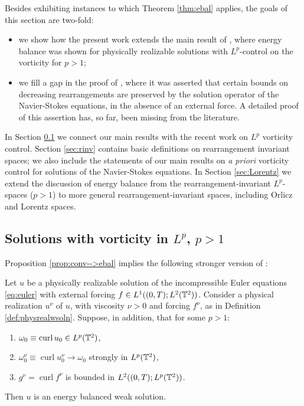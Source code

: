 \documentclass[reqno,12pt]{amsart}
\DeclareMathOperator{\curl}{curl}
\begin{document}
Besides exhibiting instances to which Theorem \ref{thm:ebal} applies, the goals of this section are two-fold:
\begin{itemize}
\item[(i)] we show how the present work extends the main result of \cite[Thm. 2.4]{LN2022}, where energy balance was shown for physically realizable solutions with $L^p$-control on the vorticity for $p>1$;

\item[(ii)] we fill a gap in the proof of \cite[Corollary 2.13]{LMPP2021a}, where it was asserted that certain bounds on decreasing rearrangements are preserved by the solution operator of the Navier-Stokes equations, in the absence of an external force. A detailed proof of this assertion has, so far, been missing from the literature.
\end{itemize}

In Section \ref{sec:Lp} we connect our main results with the recent work \cite{LN2022} on $L^p$ vorticity control. Section \ref{sec:rinv} contains basic definitions on rearrangement invariant spaces; we also include the statements of our main results on {\it a priori} vorticity control for solutions of the Navier-Stokes equations. In Section \ref{sec:Lorentz} we extend the discussion of energy balance from the rearrangement-invariant $L^p$-spaces ($p>1$) to more general rearrangement-invariant spaces, including Orlicz and Lorentz spaces.

\subsection{Solutions with vorticity in $L^p$, $p>1$}
\label{sec:Lp}

Proposition \ref{prop:conv-->ebal}  implies the following stronger version of \cite[Thm. 2.4]{LN2022}:
\begin{corollary}
  \label{cor:Lp}
  Let $u$ be a physically realizable solution of the incompressible Euler equations \eqref{eq:euler} with external forcing $f \in L^1((0,T);L^2(\mathbb{T}^2))$. Consider a physical realization $u^\nu $ of $u$, with viscosity $\nu > 0$ and forcing $f^\nu $, as in Definition \ref{def:physrealwsoln}. Suppose, in addition, that for some $p>1$:
  \begin{enumerate}
  \item $\omega_0 \equiv \curl u_0  \in L^p(\T^2)$,
  \item $\omega_0^\nu \equiv \curl u_0^\nu  \to \omega_0$ strongly in $L^p(\mathbb{T}^2)$,
  \item $g^\nu = \curl f^\nu $ is bounded in $L^2((0,T);L^p(\mathbb{T}^2))$.
  \end{enumerate}
  Then $u$ is an energy balanced weak solution.
\end{corollary}
\end{document}
